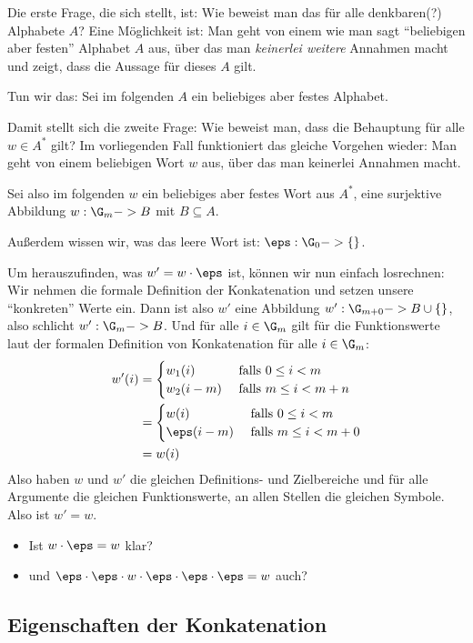 \begin{beweis}
  Die erste Frage, die sich stellt, ist: Wie beweist man das für alle
  denkbaren(?) Alphabete $A$? Eine Möglichkeit ist: Man geht von einem
  wie man sagt "`beliebigen aber festen"' Alphabet $A$ aus, über das
  man \emph{keinerlei weitere} Annahmen macht und zeigt, dass die
  Aussage für dieses $A$ gilt.

  Tun wir das: Sei im folgenden $A$ ein beliebiges aber festes
  Alphabet.

  Damit stellt sich die zweite Frage: Wie beweist man, dass die
  Behauptung für alle $w\in A^*$ gilt? Im vorliegenden Fall
  funktioniert das gleiche Vorgehen wieder: Man geht von einem
  beliebigen Wort $w$ aus, über das man keinerlei Annahmen macht.

  Sei also im folgenden $w$ ein beliebiges aber festes Wort aus $A^*$,
  \dh eine surjektive Abbildung $w:\G_m->B$ mit $B\subseteq A$.

  Außerdem wissen wir, was das leere Wort ist: $\eps:\G_0->\{\}$.

  Um herauszufinden, was $w'=w\cdot\eps$ ist, können wir nun einfach
  losrechnen: Wir nehmen die formale Definition der Konkatenation und
  setzen unsere "`konkreten"' Werte ein. Dann ist also $w'$ eine
  Abbildung $w': \G_{m+0} -> B\cup\{\}$, also schlicht $w': \G_{m} ->
  B$. Und für alle $i\in \G_m$ gilt für die Funktionswerte laut der
  formalen Definition von Konkatenation für alle $i\in \G_m$:
  \begin{align*}
    w'(i) & = \begin{cases}
      w_1(i) & \text{ falls } 0\leq i<m \\
      w_2(i-m) & \text{ falls } m \leq i<m+n
    \end{cases} \\
    & = \begin{cases}
      w(i) & \text{ falls } 0\leq i<m \\
      \eps(i-m) & \text{ falls } m \leq i<m+0
    \end{cases} \\
    & = w(i)
  \end{align*}
  Also haben $w$ und $w'$ die gleichen Definitions- und Zielbereiche
  und für alle Argumente die gleichen Funktionswerte, \dh an allen
  Stellen die gleichen Symbole. Also ist $w'=w$.
\end{beweis}

\begin{tutorium}
  \begin{itemize}
  \item  Ist $w\cdot \eps = w$ klar?
  \item und $\eps \cdot \eps \cdot w\cdot \eps \cdot \eps \cdot \eps =
    w$ auch?
  \end{itemize}
\end{tutorium}
\Tut\subsection{Eigenschaften der Konkatenation}

